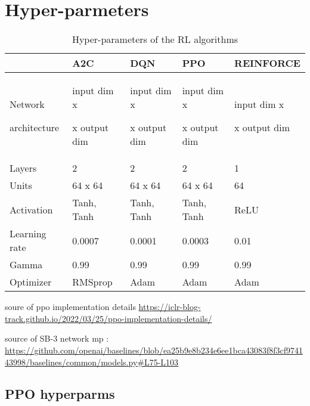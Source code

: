 \documentclass[]{article}
\newcommand{\rowspace}[1]{\renewcommand{\arraystretch}{#1}}
\begin{document}
	
\section{Hyper-parmeters}

\begin{table*}\centering
	\sffamily
	\rowspace{1.5}
	\begin{tabular}{L{2cm} R{2.5cm} R{2.5cm} R{2.5cm} R{3cm}}
		\toprule
		&\textbf{A2C}&\textbf{DQN}&\textbf{PPO}&\textbf{REINFORCE}\\ \midrule
		
		Network\par architecture&input dim x\par [64|Tanh x 64|Tanh]\par x output dim&input dim x\par [64|Tanh x 64|Tanh]\par x output dim&input dim x\par [64|Tanh x 64|Tanh]\par x output dim&input dim x\par [64|ReLU]\par x output dim\\
		Layers&2&2&2&1\\
		Units&64  x 64&64  x 64&64  x 64&64\\
		Activation&Tanh, Tanh&Tanh, Tanh&Tanh, Tanh&ReLU\\
		Learning rate&0.0007&0.0001&0.0003&0.01\\
		Gamma&0.99&0.99&0.99&0.99\\
		Optimizer&RMSprop&Adam&Adam&Adam\\
			
		\bottomrule
	\end{tabular}
	\caption{Hyper-parameters of the RL algorithms}
	\label{tbl:hyperparameters}
\end{table*}



soure of ppo implementation details \url{https://iclr-blog-track.github.io/2022/03/25/ppo-implementation-details/}

source of SB-3 network mp : \url{https://github.com/openai/baselines/blob/ea25b9e8b234e6ee1bca43083f8f3cf974143998/baselines/common/models.py#L75-L103}

\subsection{PPO hyperparms}
\end{document}
